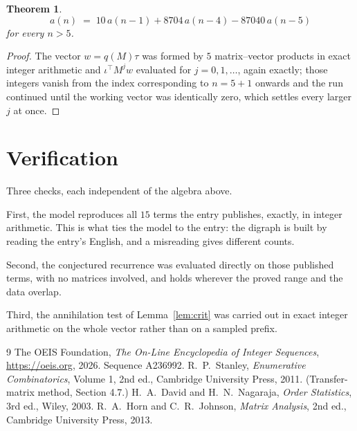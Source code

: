 \documentclass[11pt,a4paper]{article}
\theoremstyle{plain}
\newtheorem{theorem}{Theorem}
\theoremstyle{definition}
\begin{document}
\begin{theorem}
\[
a(n)\;=\;10\,a(n-1) + 8704\,a(n-4) - 87040\,a(n-5)
\]
for every $n>5$.
\end{theorem}

\begin{proof}
The vector $w=q(M)\tau$ was formed by $5$ matrix--vector products in exact integer
arithmetic and $\iota^{\!\top}M^{j}w$ evaluated for $j=0,1,\dots$, again exactly; those
integers vanish from the index corresponding to $n=5+1$ onwards and the run continued
until the working vector was identically zero, which settles every larger $j$ at once.
\end{proof}

\section{Verification}

Three checks, each independent of the algebra above.

First, the model reproduces all $15$ terms the entry publishes, exactly, in integer
arithmetic. This is what ties the model to the entry: the digraph is built by reading the
entry's English, and a misreading gives different counts.

Second, the conjectured recurrence was evaluated directly on those published terms, with no
matrices involved, and holds wherever the proved range and the data overlap.

Third, the annihilation test of Lemma~\ref{lem:crit} was carried out in exact integer
arithmetic on the whole vector rather than on a sampled prefix.

\begin{thebibliography}{9}
 The OEIS Foundation, \emph{The On-Line Encyclopedia of Integer
Sequences}, \url{https://oeis.org}, 2026. Sequence A236992.
 R.~P.~Stanley, \emph{Enumerative Combinatorics}, Volume 1, 2nd ed.,
Cambridge University Press, 2011. (Transfer-matrix method, Section 4.7.)
 H.~A.~David and H.~N.~Nagaraja, \emph{Order Statistics}, 3rd ed., Wiley,
2003.
 R.~A.~Horn and C.~R.~Johnson, \emph{Matrix Analysis}, 2nd ed., Cambridge
University Press, 2013.
\end{thebibliography}
\end{document}
